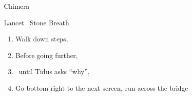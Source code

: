 \begin{battle}{Chimera}
  \begin{itemize}
    \kimahrif Lancet
    \kimahrif \od\ Stone Breath
  \end{itemize}
\end{battle}
\begin{enumerate}[resume]
  \item Walk down steps, \cs[1:30]
  \item Before going further, 
  \item \sd\ until Tidus asks ``why'', \cs[6:20]
  \item Go bottom right to the next screen, run across the bridge
\end{enumerate}